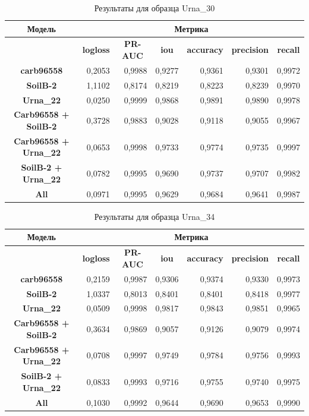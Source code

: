 \documentclass[14pt, a4paper, oneside, bold]{extarticle}
\begin{document}
\begin{table}[htbp]
\small
\begin{tabular}{|c|r|r|r|r|r|r|}
\hline
\textbf{Модель} & \multicolumn{ 6}{c|}{\textbf{Метрика}} \\ \hline
\textbf{} & \multicolumn{1}{c|}{\textbf{logloss}} & \multicolumn{1}{c|}{\textbf{PR-AUC}} & \multicolumn{1}{c|}{\textbf{iou}} & \multicolumn{1}{c|}{\textbf{accuracy}} & \multicolumn{1}{c|}{\textbf{precision}} & \multicolumn{1}{c|}{\textbf{recall}} \\ \hline
\textbf{carb96558} & 0,2053 & 0,9988 & 0,9277 & 0,9361 & 0,9301 & 0,9972 \\ \hline
\textbf{SoilB-2} & 1,1102 & 0,8174 & 0,8219 & 0,8223 & 0,8239 & 0,9970 \\ \hline
\textbf{Urna\_22} & 0,0250 & 0,9999 & 0,9868 & 0,9891 & 0,9890 & 0,9978 \\ \hline
\textbf{Carb96558 + SoilB-2} & 0,3728 & 0,9883 & 0,9028 & 0,9118 & 0,9055 & 0,9967 \\ \hline
\textbf{Carb96558 + Urna\_22} & 0,0653 & 0,9998 & 0,9733 & 0,9774 & 0,9735 & 0,9997 \\ \hline
\textbf{SoilB-2 + Urna\_22} & 0,0782 & 0,9995 & 0,9690 & 0,9737 & 0,9707 & 0,9982 \\ \hline
\textbf{All} & 0,0971 & 0,9995 & 0,9629 & 0,9684 & 0,9641 & 0,9987 \\ \hline
\end{tabular}
\caption{Результаты для образца Urna\_30}
\label{Urna_30}
\end{table}


\begin{table}[htbp]
\small
\begin{tabular}{|c|r|r|r|r|r|r|}
\hline
\textbf{Модель} & \multicolumn{ 6}{c|}{\textbf{Метрика}} \\ \hline
\textbf{} & \multicolumn{1}{c|}{\textbf{logloss}} & \multicolumn{1}{c|}{\textbf{PR-AUC}} & \multicolumn{1}{c|}{\textbf{iou}} & \multicolumn{1}{c|}{\textbf{accuracy}} & \multicolumn{1}{c|}{\textbf{precision}} & \multicolumn{1}{c|}{\textbf{recall}} \\ \hline
\textbf{carb96558} & 0,2159 & 0,9987 & 0,9306 & 0,9374 & 0,9330 & 0,9973 \\ \hline
\textbf{SoilB-2} & 1,0337 & 0,8013 & 0,8401 & 0,8401 & 0,8418 & 0,9977 \\ \hline
\textbf{Urna\_22} & 0,0509 & 0,9998 & 0,9817 & 0,9843 & 0,9851 & 0,9965 \\ \hline
\textbf{Carb96558 + SoilB-2} & 0,3634 & 0,9869 & 0,9057 & 0,9126 & 0,9079 & 0,9974 \\ \hline
\textbf{Carb96558 + Urna\_22} & 0,0708 & 0,9997 & 0,9749 & 0,9784 & 0,9756 & 0,9993 \\ \hline
\textbf{SoilB-2 + Urna\_22} & 0,0833 & 0,9993 & 0,9716 & 0,9755 & 0,9740 & 0,9975 \\ \hline
\textbf{All} & 0,1030 & 0,9992 & 0,9644 & 0,9690 & 0,9653 & 0,9990 \\ \hline
\end{tabular}
\caption{Результаты для образца Urna\_34}
\label{Urna_34}
\end{table}
\end{document}
